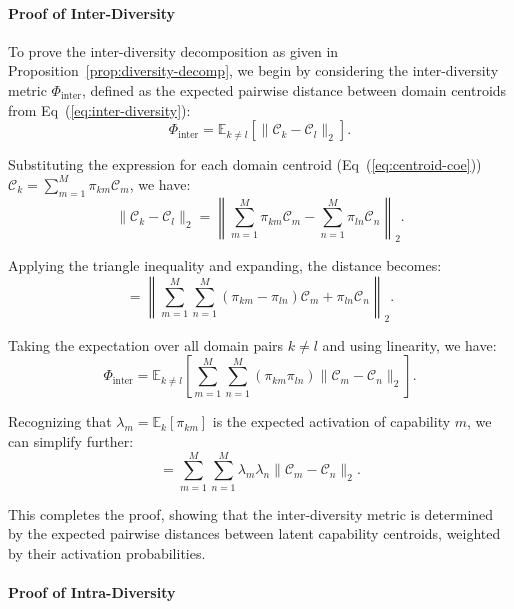 \paragraph{Proof of Inter-Diversity}

To prove the inter-diversity decomposition as given in Proposition~\ref{prop:diversity-decomp}, we begin by considering the inter-diversity metric \(\Phi_{\text{inter}}\), defined as the expected pairwise distance between domain centroids from Eq~(\ref{eq:inter-diversity}):
\begin{equation}
\Phi_{\text{inter}} = \mathbb{E}_{k \neq l} \left[ \|\mathcal{C}_k - \mathcal{C}_l\|_2 \right].
\end{equation}

Substituting the expression for each domain centroid (Eq~(\ref{eq:centroid-coe})) \(\mathcal{C}_k = \sum_{m=1}^M \pi_{km} \mathcal{C}_m\), we have:
\begin{equation}
    \|\mathcal{C}_k - \mathcal{C}_l\|_2 = \left\| \sum_{m=1}^M \pi_{km} \mathcal{C}_m - \sum_{n=1}^M \pi_{ln} \mathcal{C}_n \right\|_2.
\end{equation}

Applying the triangle inequality and expanding, the distance becomes:
\begin{equation}
    = \left\| \sum_{m=1}^M \sum_{n=1}^M (\pi_{km} - \pi_{ln}) \mathcal{C}_m + \pi_{ln} \mathcal{C}_n \right\|_2.
\end{equation}

Taking the expectation over all domain pairs \(k \neq l\) and using linearity, we have:
\begin{equation}
    \Phi_{\text{inter}} = \mathbb{E}_{k \neq l} \left[ \sum_{m=1}^M \sum_{n=1}^M (\pi_{km} \pi_{ln}) \|\mathcal{C}_m - \mathcal{C}_n\|_2 \right].
\end{equation}

Recognizing that \(\lambda_m = \mathbb{E}_k[\pi_{km}]\) is the expected activation of capability \(m\), we can simplify further:
\begin{equation}
    = \sum_{m=1}^M \sum_{n=1}^M \lambda_m \lambda_n \|\mathcal{C}_m - \mathcal{C}_n\|_2.
\end{equation}

This completes the proof, showing that the inter-diversity metric is determined by the expected pairwise distances between latent capability centroids, weighted by their activation probabilities.

\paragraph{Proof of Intra-Diversity}

